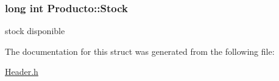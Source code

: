 \subsubsection[{\texorpdfstring{Stock}{Stock}}]{\setlength{\rightskip}{0pt plus 5cm}long int Producto\+::\+Stock}\hypertarget{structProducto_aa97b1c641bd18ab3346430bec2ec23ed}{}\label{structProducto_aa97b1c641bd18ab3346430bec2ec23ed}
stock disponible 

The documentation for this struct was generated from the following file\+:\begin{DoxyCompactItemize}
\item 
\hyperlink{Header_8h}{Header.\+h}\end{DoxyCompactItemize}
